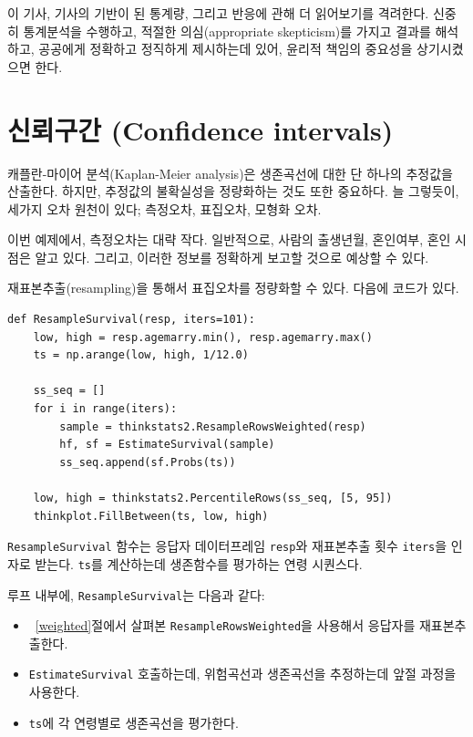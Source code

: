 이 기사, 기사의 기반이 된 통계량, 그리고 반응에 관해 더 읽어보기를 격려한다. 신중히 통계분석을 수행하고, 적절한 의심(appropriate skepticism)를 가지고 결과를 해석하고, 공공에게 정확하고 정직하게 제시하는데 있어, 윤리적 책임의 중요성을 상기시켰으면 한다.


\section{신뢰구간 (Confidence intervals)}

캐플란-마이어 분석(Kaplan-Meier analysis)은 생존곡선에 대한 단 하나의 추정값을 산출한다. 하지만, 추정값의 불확실성을 정량화하는 것도 또한 중요하다. 늘 그렇듯이, 세가지 오차 원천이 있다; 측정오차, 표집오차, 모형화 오차.


이번 예제에서, 측정오차는 대략 작다. 일반적으로, 사람의 출생년월, 혼인여부, 혼인 시점은 알고 있다. 그리고, 이러한 정보를 정확하게 보고할 것으로 예상할 수 있다.

재표본추출(resampling)을 통해서 표집오차를 정량화할 수 있다. 다음에 코드가 있다.

\begin{verbatim}
def ResampleSurvival(resp, iters=101):
    low, high = resp.agemarry.min(), resp.agemarry.max()
    ts = np.arange(low, high, 1/12.0)

    ss_seq = []
    for i in range(iters):
        sample = thinkstats2.ResampleRowsWeighted(resp)
        hf, sf = EstimateSurvival(sample)
        ss_seq.append(sf.Probs(ts))

    low, high = thinkstats2.PercentileRows(ss_seq, [5, 95])
    thinkplot.FillBetween(ts, low, high)
\end{verbatim}

{\tt ResampleSurvival} 함수는 응답자 데이터프레임 {\tt resp}와
재표본추출 횟수 {\tt iters}을 인자로 받는다.
{\tt ts}를 계산하는데 생존함수를 평가하는 연령 시퀀스다.

루프 내부에, {\tt ResampleSurvival}는 다음과 같다:

\begin{itemize}

\item ~\ref{weighted}절에서 살펴본 {\tt ResampleRowsWeighted}을 사용해서 응답자를 재표본추출한다.

\item {\tt EstimateSurvival} 호출하는데, 위험곡선과 생존곡선을 추정하는데 앞절 과정을 사용한다.

\item {\tt ts}에 각 연령별로 생존곡선을 평가한다.

\end{itemize}

